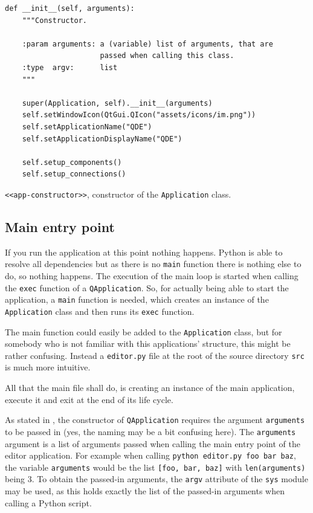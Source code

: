 \documentclass[10pt, openright, notitlepage]{scrreprt}
\begin{document}
\begin{listing}[H]
\begin{verbatim}
def __init__(self, arguments):
    """Constructor.

    :param arguments: a (variable) list of arguments, that are
                      passed when calling this class.
    :type  argv:      list
    """

    super(Application, self).__init__(arguments)
    self.setWindowIcon(QtGui.QIcon("assets/icons/im.png"))
    self.setApplicationName("QDE")
    self.setApplicationDisplayName("QDE")

    self.setup_components()
    self.setup_connections()
\end{verbatim}
\caption{\label{app-constructor}
\texttt{<<app-constructor>>}, constructor of the \texttt{Application} class.}
\end{listing}

\subsection{Main entry point}
\label{sec:org57bc3c7}

If you run the application at this point nothing happens. Python is able to
resolve all dependencies but as there is no \texttt{main} function there is nothing
else to do, so nothing happens. The execution of the main loop is started when
calling the \texttt{exec} function of a \texttt{QApplication}. So, for actually being able to
start the application, a \texttt{main} function is needed, which creates an instance of
the \texttt{Application} class and then runs its \texttt{exec} function.

The main function could easily be added to the \texttt{Application} class, but for
somebody who is not familiar with this applications' structure, this might be
rather confusing. Instead a \texttt{editor.py} file at the root of the source directory
\texttt{src} is much more intuitive.

All that the main file shall do, is creating an instance of the main
application, execute it and exit at the end of its life cycle.

As stated in \label{Imports}, the constructor of \texttt{QApplication} requires the
argument \texttt{arguments} to be passed in (yes, the naming may be a bit confusing
here). The \texttt{arguments} argument is a list of arguments passed when calling the
main entry point of the editor application. For example when calling \texttt{python editor.py foo bar baz},
the variable \texttt{arguments} would be the list \texttt{[foo, bar, baz]} with
\texttt{len(arguments)} being 3. To obtain the passed-in arguments, the \texttt{argv}
attribute of the \texttt{sys} module may be used, as this holds exactly the list of the
passed-in arguments when calling a Python script.
\end{document}
